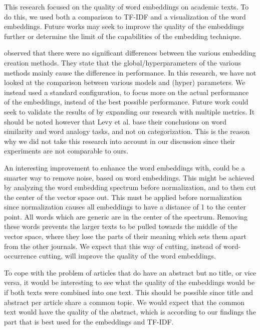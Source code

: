 \documentclass[../../Thesis.tex]{subfiles}
\begin{document}
This research focused on the quality of word embeddings on academic texts. To do this, we used both a comparison to TF-IDF and a visualization of the word embeddings. Future works may seek to improve the quality of the embeddings further or determine the limit of the capabilities of the embedding technique. 

\citet{levy2015improving} observed that there were no significant differences between the various embedding creation methods. They state that the global/hyperparameters of the various methods mainly cause the difference in performance. In this research, we have not looked at the comparison between various models and (hyper) parameters. We instead used a standard configuration, to focus more on the actual performance of the embeddings, instead of the best possible performance. Future work could seek to validate the results of \citet{levy2015improving} by expanding our research with multiple metrics. It should be noted however that Levy et al. base their conclusions on word similarity and word analogy tasks, and not on categorization. This is the reason why we did not take this research into account in our discussion since their experiments are not comparable to ours.

An interesting improvement to enhance the word embeddings with, could be a smarter way to remove noise, based on word embeddings. This might be achieved by analyzing the word embedding spectrum before normalization, and to then cut the center of the vector space out. This must be applied before normalization since normalization causes all embeddings to have a distance of 1 to the center point. All words which are generic are in the center of the spectrum. Removing these words prevents the larger texts to be pulled towards the middle of the vector space, where they lose the parts of their meaning which sets them apart from the other journals. We expect that this way of cutting, instead of word-occurrence cutting, will improve the quality of the word embeddings.

To cope with the problem of articles that do have an abstract but no title, or vice versa, it would be interesting to see what the quality of the embeddings would be if both texts were combined into one text. This should be possible since title and abstract per article share a common topic. We would expect that the common text would have the quality of the abstract, which is according to our findings the part that is best used for the embeddings and TF-IDF.
\end{document}
